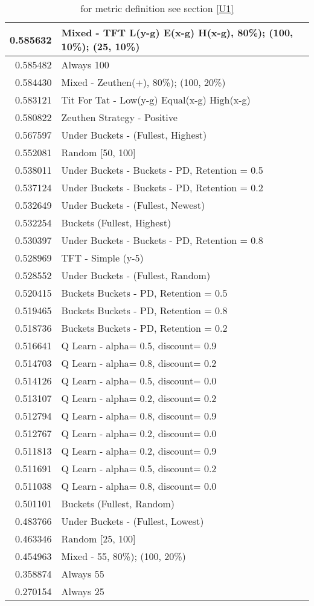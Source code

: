 \begin{table}[!hbtp]
\begin{footnotesize}
\begin{tabular}{|r|l|}
0.585632 & Mixed - {TFT L(y-g) E(x-g) H(x-g), 80\%); (100, 10\%); (25, 10\%)}\\ \hline
0.585482 & Always 100\\ \hline
0.584430 & Mixed - {Zeuthen(+), 80\%); (100, 20\%)}\\ \hline
0.583121 & Tit For Tat - Low(y-g) Equal(x-g) High(x-g)\\ \hline
0.580822 & Zeuthen Strategy - Positive\\ \hline
0.567597 & Under Buckets - (Fullest, Highest)\\ \hline
0.552081 & Random [50, 100]\\ \hline
0.538011 & Under Buckets - Buckets - PD, Retention = 0.5\\ \hline
0.537124 & Under Buckets - Buckets - PD, Retention = 0.2\\ \hline
0.532649 & Under Buckets - (Fullest, Newest)\\ \hline
0.532254 & Buckets (Fullest, Highest)\\ \hline
0.530397 & Under Buckets - Buckets - PD, Retention = 0.8\\ \hline
0.528969 & TFT - Simple (y-5)\\ \hline
0.528552 & Under Buckets - (Fullest, Random)\\ \hline
0.520415 & Buckets Buckets - PD, Retention = 0.5\\ \hline
0.519465 & Buckets Buckets - PD, Retention = 0.8\\ \hline
0.518736 & Buckets Buckets - PD, Retention = 0.2\\ \hline
0.516641 & Q Learn - alpha= 0.5, discount= 0.9\\ \hline
0.514703 & Q Learn - alpha= 0.8, discount= 0.2\\ \hline
0.514126 & Q Learn - alpha= 0.5, discount= 0.0\\ \hline
0.513107 & Q Learn - alpha= 0.2, discount= 0.2\\ \hline
0.512794 & Q Learn - alpha= 0.8, discount= 0.9\\ \hline
0.512767 & Q Learn - alpha= 0.2, discount= 0.0\\ \hline
0.511813 & Q Learn - alpha= 0.2, discount= 0.9\\ \hline
0.511691 & Q Learn - alpha= 0.5, discount= 0.2\\ \hline
0.511038 & Q Learn - alpha= 0.8, discount= 0.0\\ \hline
0.501101 & Buckets (Fullest, Random)\\ \hline
0.483766 & Under Buckets - (Fullest, Lowest)\\ \hline
0.463346 & Random [25, 100]\\ \hline
0.454963 & Mixed - {55, 80\%); (100, 20\%)}\\ \hline
0.358874 & Always 55\\ \hline
0.270154 & Always 25\\ \hline
\end{tabular}
\caption{for metric definition see section \eqref{U1}}
\end{footnotesize}
\end{table}

